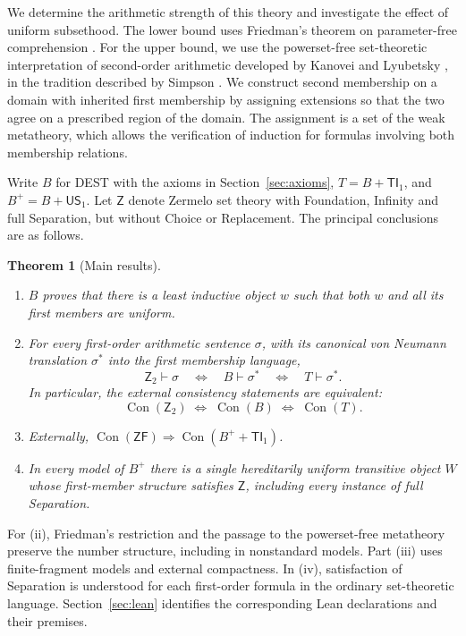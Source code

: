 \documentclass[11pt,a4paper]{article}
\numberwithin{equation}{section}
\newtheorem{theorem}{Theorem}[section]
\theoremstyle{definition}
\theoremstyle{remark}
\newcommand{\Ztwo}{\mathsf{Z}_2}
\newcommand{\ZF}{\mathsf{ZF}}
\newcommand{\Zerm}{\mathsf{Z}}
\newcommand{\TI}{\mathsf{TI}_1}
\newcommand{\US}{\mathsf{US}_1}
\newcommand{\Con}{\operatorname{Con}}
\begin{document}
We determine the arithmetic strength of this theory and investigate the effect of uniform subsethood. The lower bound uses Friedman's theorem on parameter-free comprehension \cite{friedman,gitman}. For the upper bound, we use the powerset-free set-theoretic interpretation of second-order arithmetic developed by Kanovei and Lyubetsky \cite{kl,kl2}, in the tradition described by Simpson \cite{simpson}. We construct second membership on a domain with inherited first membership by assigning extensions so that the two agree on a prescribed region of the domain. The assignment is a set of the weak metatheory, which allows the verification of induction for formulas involving both membership relations.

Write $B$ for DEST with the axioms in Section~\ref{sec:axioms}, $T=B+\TI$, and $B^+ = B+\US$. Let $\Zerm$ denote Zermelo set theory with Foundation, Infinity and full Separation, but without Choice or Replacement. The principal conclusions are as follows.
\begin{theorem}[Main results]\label{thm:main}
\leavevmode
\begin{enumerate}[label=(\roman*)]
\item $B$ proves that there is a least inductive object $w$ such that both $w$ and all its first members are uniform.
\item For every first-order arithmetic sentence $\sigma$, with its canonical von Neumann translation $\sigma^*$ into the first membership language,
\[
 \Ztwo\vdash\sigma\quad\Longleftrightarrow\quad B\vdash\sigma^*
 \quad\Longleftrightarrow\quad T\vdash\sigma^*.
\]
In particular, the external consistency statements are equivalent:
\[\Con(\Ztwo)\;\Longleftrightarrow\;\Con(B)\;\Longleftrightarrow\;\Con(T).\]
\item Externally, $\Con(\ZF)\Longrightarrow\Con(B^+ + \TI)$.
\item In every model of $B^+$ there is a single hereditarily uniform transitive object $W$ whose first-member structure satisfies $\Zerm$, including every instance of full Separation.
\end{enumerate}
\end{theorem}
For (ii), Friedman's restriction and the passage to the powerset-free metatheory preserve the number structure, including in nonstandard models. Part (iii) uses finite-fragment models and external compactness. In (iv), satisfaction of Separation is understood for each first-order formula in the ordinary set-theoretic language. Section~\ref{sec:lean} identifies the corresponding Lean declarations and their premises.
\end{document}
